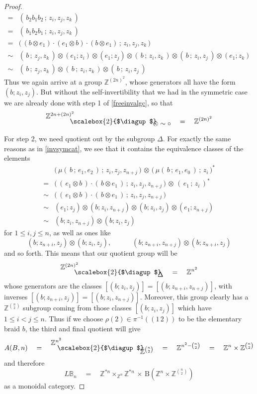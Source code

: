 \documentclass{amsbook} %
\newcommand{\bigquotient}[2]{ \raisebox{0.75\height}{$#1$} \mkern-12mu\scalebox{2}{$\diagup$}\mkern-10mu \raisebox{-0.5\height}{$#2$} }
\numberwithin{section}{chapter}
\begin{document}
\begin{proof}
\[\begin{array}{rl}
			= & ( \, b_2 b_1 b_2 \, ; \, z_i, z_j, z_k \, ) \\
			= & ( \, b_1 b_2 b_1 \, ; \, z_i, z_j, z_k \, ) \\
			= & \big( \, (b \otimes e_1) \cdot (e_1 \otimes b) \cdot (b \otimes e_1) \, ; \, z_i, z_j, z_k \, \big) \\
			\sim & ( \, b\, ; \, z_j, z_k \, ) \otimes (e_1; z_i) \otimes (e_1; z_j) \otimes ( \, b \, ; \, z_i, z_k \, ) \otimes ( \, b \, ; \, z_i, z_j \, ) \otimes (e_1; z_k) \\
			\sim & ( \, b \, ; \, z_j, z_k \, ) \otimes ( \, b \, ; \, z_i, z_k \, ) \otimes ( \, b \, ; \, z_i, z_j \, )
		\end{array}
\]
Thus we again arrive at a group $\mathbb{Z}^{(2n)^2}$, whose generators all have the form $(b; z_i, z_j)$. But without the self-invertibility that we had in the symmetric case we are already done with step 1 of \cref{freeinvalgc}, so that
\[ \bigquotient{\mathbb{Z}^{2n + (2n)^2}}{\otimes \sim \circ} \quad = \quad \mathbb{Z}^{(2n)^2} \]

For step 2, we need quotient out by the subgroup $\Delta$. For exactly the same reasons as in \cref{invsymcat}, we see that it contains the equivalence classes of the elements
\[ \begin{array}{rl}
			& \big( \, \mu( \, b \, ; \, e_1, e_2 \, ) \, ; \, z_i , z_j, z_{n+j} \, \big) \, \otimes \, \big( \,  \mu( \, b \, ; \, e_1, e_0 \, ) \, ; \, z_i \, \big)^* \\
			= & \big( \, ( \, e_1 \otimes b \, ) \cdot ( \, b \otimes e_1 \,) \, ; \, z_i , z_j, z_{n+j} \, \big) \, \otimes \, ( \, e_1 \, ; \, z_i \, )^* \\
			\sim & \big( \, ( \, e_1 \otimes b \, ) \cdot ( \, b \otimes e_1 \,) \, ; \, z_i , z_j, z_{n+j} \, \big) \\
			\sim &  (e_1 ; z_j) \otimes ( b ;  z_i, z_{n+j}) \otimes ( b ;  z_i , z_{j} ) \otimes (e_1 ;z_{n+j}) \\
			\sim & (b ;  z_i, z_{n+j}) \otimes (b;  z_i , z_j)
		\end{array}
\]
for $1 \le i,j \le n$, as well as ones like
\[ (b ;  z_{n+i}, z_j) \otimes (b;  z_i , z_j), \quad \quad \quad (b; z_{n+i}, z_{n+j}) \otimes (b;  z_{n+i} , z_j) \]
and so forth. This means that our quotient group will be
\[ \bigquotient{\mathbb{Z}^{(2n)^2}}{\Delta} \quad = \quad \mathbb{Z}^{n^2} \]
whose generators are the classes $[(b; z_i, z_j)] = [(b; z_{n+i}, z_{n+j})]$, with inverses $[(b; z_{n+i}, z_j)] = [(b; z_i, z_{n+j})]$. Moreover, this group clearly has a $\mathbb{Z}^{{n}\choose{2}}$ subgroup coming from those classes $[(b; z_i, z_j)]$ which have $1 \le i < j \le n$. Thus if we choose $\rho(2) \in \pi^{-1}((1 \, 2))$ to be the elementary braid $b$, the third and final quotient will give
\[ A(B,n) \quad = \quad \bigquotient{\mathbb{Z}^{n^2}}{\mathbb{Z}^{{n}\choose{2}}} \quad = \quad \mathbb{Z}^{n^2 - {{n}\choose{2}}} \quad = \quad \mathbb{Z}^{n} \times \mathbb{Z}^{{n}\choose{2}} \]
and therefore
\[ L\mathbb{B}_n \quad = \quad \mathbb{Z}^{\ast n} \times_{\mathbb{Z}^n} \mathbb{Z}^{\ast n}  \, \times \, \mathrm{B}(\mathbb{Z}^{n} \times \mathbb{Z}^{{n}\choose{2}}) \]
as a monoidal category.
\end{proof} 
\end{document}
